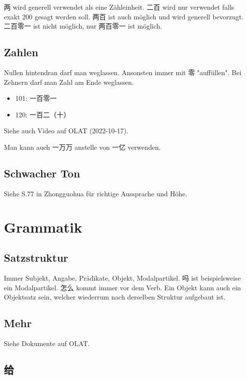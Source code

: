 \documentclass[UTF8]{ctexart}
\begin{document}
两 wird generell verwendet als eine Zähleinheit. 二百 wird nur verwendet falls exakt 200 gesagt werden soll. 两百 ist auch möglich und wird generell bevorzugt. 二百零一 ist nicht möglich, nur 两百零一 ist möglich.

\subsection{Zahlen}

Nullen hintendran darf man weglassen. Ansonsten immer mit 零 "auffüllen". Bei Zehnern darf man Zahl am Ende weglassen.

\begin{itemize}
    \item 101: 一百零一
    \item 120: 一百二（十）
\end{itemize}

Siehe auch Video auf OLAT (2022-10-17).

Man kann auch 一万万 anstelle von 一亿 verwenden.


\subsection{Schwacher Ton}

Siehe S.77 in Zhongguohua für richtige Aussprache und Höhe.

\section{Grammatik}

\subsection{Satzstruktur}

Immer Subjekt, Angabe, Prädikate, Objekt, Modalpartikel.
吗 ist beispielsweise ein Modalpartikel. 怎么 kommt immer vor dem Verb. Ein Objekt kann auch ein Objektsatz sein, welcher wiederrum nach derselben Struktur aufgebaut ist.

\subsection{Mehr}

Siehe Dokumente auf OLAT.

\subsection{给}
\end{document}
